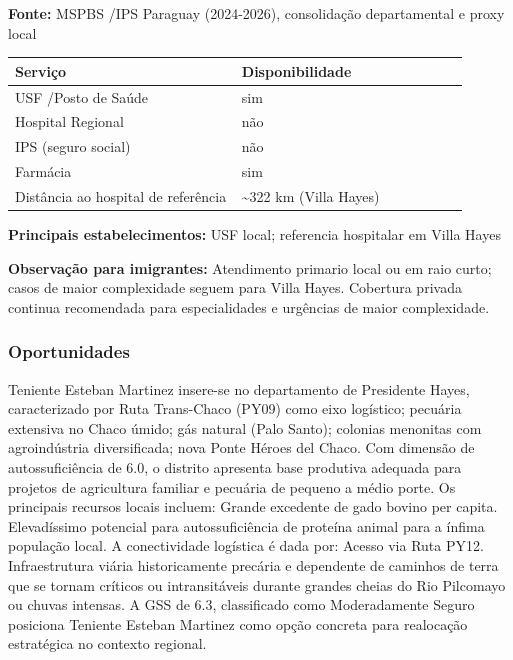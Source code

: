 \textbf{Fonte:} MSPBS /\allowbreak  IPS Paraguay (2024-2026), consolidação
departamental e proxy local

{\def\LTcaptype{none} %
\begin{longtable}{@{}>{\raggedright\arraybackslash}p{0.45\linewidth} >{\raggedright\arraybackslash}p{0.45\linewidth}@{}}
\toprule\noalign{}
Serviço & Disponibilidade \\
\midrule\noalign{}
\endhead
\bottomrule\noalign{}
\endlastfoot
USF /\allowbreak  Posto de Saúde & sim \\
Hospital Regional & não \\
IPS (seguro social) & não \\
Farmácia & sim \\
Distância ao hospital de referência & \textasciitilde322 km (Villa
Hayes) \\
\end{longtable}
}

\textbf{Principais estabelecimentos:} USF local; referencia hospitalar
em Villa Hayes

\textbf{Observação para imigrantes:} Atendimento primario local ou em
raio curto; casos de maior complexidade seguem para Villa Hayes.
Cobertura privada continua recomendada para especialidades e urgências
de maior complexidade.
\newpage

\subsubsection*{Oportunidades}\label{oport-teniente-esteban-martinez-1508}
Teniente Esteban Martinez insere-se no departamento de Presidente Hayes, caracterizado por Ruta Trans-Chaco (PY09) como eixo logístico; pecuária extensiva no Chaco úmido; gás natural (Palo Santo); colonias menonitas com agroindústria diversificada; nova Ponte Héroes del Chaco. Com dimensão de autossuficiência de 6.0, o distrito apresenta base produtiva adequada para projetos de agricultura familiar e pecuária de pequeno a médio porte. Os principais recursos locais incluem: Grande excedente de gado bovino per capita. Elevadíssimo potencial para autossuficiência de proteína animal para a ínfima população local. A conectividade logística é dada por: Acesso via Ruta PY12. Infraestrutura viária historicamente precária e dependente de caminhos de terra que se tornam críticos ou intransitáveis durante grandes cheias do Rio Pilcomayo ou chuvas intensas. A GSS de 6.3, classificado como Moderadamente Seguro posiciona Teniente Esteban Martinez como opção concreta para realocação estratégica no contexto regional.

